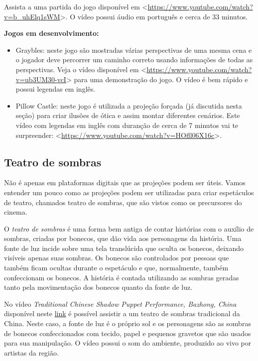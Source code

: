 Assista a uma partida do jogo disponível em \textless{}\url{https://www.youtube.com/watch?v=b\_uhElq1sWM}\textgreater{}. O vídeo possui áudio em português e cerca de 33 minutos.

\textbf{Jogos em desenvolvimento:}
\begin{itemize}
\item {} 
Graybles: neste jogo são mostradas várias perspectivas de uma mesma cena e o jogador deve percorrer um caminho correto usando informações de todas as perspectivas. Veja o vídeo disponível em \textless{}\url{https://www.youtube.com/watch?v=ub3UM30-vcI}\textgreater{} para uma demonstração do jogo. O vídeo é bem rápido e possui legendas em inglês.

\item {} 
Pillow Castle: neste jogo é utilizada a projeção forçada (já discutida nesta seção) para criar ilusões de ótica e assim montar diferentes cenários. Este vídeo com legendas em inglês com duranção de cerca de 7 minutos vai te surpreender: \textless{}\url{https://www.youtube.com/watch?v=HOfll06X16c}\textgreater{}.

\end{itemize}


\subsection{Teatro de sombras}
\label{\detokenize{GE301-A:teatro-de-sombras}}\label{\detokenize{GE301-A:sub-teatrodesombras}}
Não é apenas em plataformas digitais que as projeções podem ser úteis. Vamos entender um pouco como as projeções podem ser utilizadas para criar espetáculos de teatro, chamados teatro de sombras, que são vistos como os precursores do cinema.

O \emph{teatro de sombras} é uma forma bem antiga de contar histórias com o auxílio de sombras, criadas por bonecos, que dão vida aos personagens da história. Uma fonte de luz incide sobre uma tela translúcida que oculta os bonecos, deixando visíveis apenas suas sombras. Os bonecos são controlados por pessoas que também ficam ocultas durante o espetáculo e que, normalmente, também confeccionam os bonecos. A história é contada utilizando as sombras geradas tanto pela movimentação dos bonecos quanto da fonte de luz.

No vídeo \emph{Traditional Chinese Shadow Puppet Performance, Bazhong, China} disponível neste \href{https://vimeo.com/41524173}{link} é possível assistir a um teatro de sombras tradicional da China. Neste caso, a fonte de luz é o próprio sol e os personagens são as sombras de bonecos confeccionados com tecido, papel e pequenos gravetos que são usados para sua manipulação. O vídeo possui o som do ambiente, produzido ao vivo por artistas da região.

